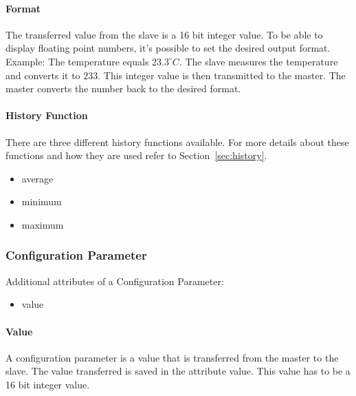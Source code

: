 
\paragraph{Format} %
\label{par:format}
The transferred value from the slave is a 16 bit integer value. To be able to display floating point numbers, it's possible to set the desired output format. Example: The temperature equals $23.3 ^\circ C$. The slave measures the temperature and converts it to $233$. This integer value is then transmitted to the master. The master converts the number back to the desired format. 

\paragraph{History Function} %
\label{par:histfunc}
There are three different history functions available. For more details about these functions and how they are used refer to Section~\ref{sec:history}.
\label{par:history_function}
\begin{itemize}
    \item average
    \item minimum
    \item maximum
\end{itemize}

\subsubsection{Configuration Parameter} %
\label{ssub:configuration_parameter}
Additional attributes of a Configuration Parameter:
\begin{itemize}
    \item value
\end{itemize}

\paragraph{Value} %
\label{par:value}
A configuration parameter is a value that is transferred from the master to the slave. The value transferred is saved in the attribute value. This value has to be a 16 bit integer value.


